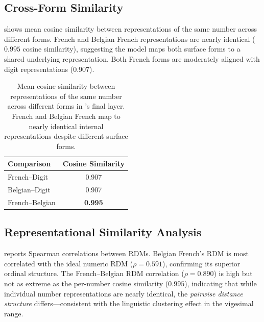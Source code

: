\subsection{Cross-Form Similarity}
\label{sec:results_crossform}

 shows mean cosine similarity between representations of the same number across different forms.
French and Belgian French representations are nearly identical ($0.995$ cosine similarity), suggesting the model maps both surface forms to a shared underlying representation.
Both French forms are moderately aligned with digit representations ($0.907$).

\begin{table}[t]
    \centering
    \caption{Mean cosine similarity between representations of the same number across different forms in \mistral's final layer. French and Belgian French map to nearly identical internal representations despite different surface forms.}
    \begin{tabular}{@{}lc@{}}
        \toprule
        \textbf{Comparison} & \textbf{Cosine Similarity} \\
        \midrule
        French--Digit & 0.907 \\
        Belgian--Digit & 0.907 \\
        French--Belgian & \textbf{0.995} \\
        \bottomrule
    \end{tabular}
    \label{tab:crossform}
\end{table}

\subsection{Representational Similarity Analysis}
\label{sec:results_rsa}

 reports Spearman correlations between RDMs.
Belgian French's RDM is most correlated with the ideal numeric RDM ($\rho = 0.591$), confirming its superior ordinal structure.
The French--Belgian RDM correlation ($\rho = 0.890$) is high but not as extreme as the per-number cosine similarity ($0.995$), indicating that while individual number representations are nearly identical, the \emph{pairwise distance structure} differs---consistent with the linguistic clustering effect in the vigesimal range.

